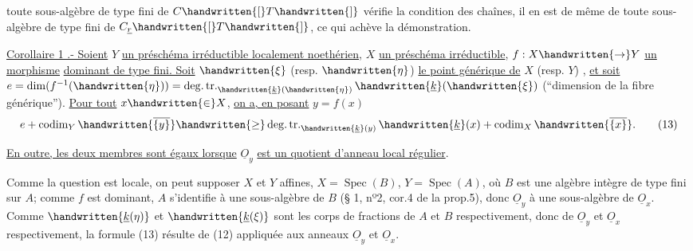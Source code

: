toute sous-algèbre de type fini de $C\handwritten{[}T\handwritten{]}$ vérifie la condition des chaînes, il en est de même de toute sous-algèbre de type fini de $C_{\underline{r}}\handwritten{[}T\handwritten{]}$, ce qui achève la démonstration.

\uline{Corollaire 1 .- Soient} $Y$ \uline{un préschéma irréductible localement noethérien}, $X$ \uline{un préschéma irréductible}, $f:X\handwritten{\to}Y$ \uline{un morphisme}  \uline{dominant de type fini. Soit} $\handwritten{\xi}$ (resp. $\handwritten{\eta}$) \uline{le point générique de} $X$ (resp. $Y$) , \uline{et soit} $e=\dim(f^{-1}(\handwritten{\eta}))=\operatorname{deg.tr.}_{\handwritten{\underline{k}}(\handwritten{\eta})}\handwritten{\underline{k}}(\handwritten{\xi})$ (``dimension de la fibre générique\unsure{/}''). \uline{Pour tout} $x\handwritten{\in}X$, \uline{on a, en posant} $y=f(x)$
\[
 e+\operatorname{codim}_Y\handwritten{\overline{\{y\}}}\handwritten{\geq}
 \operatorname{deg.tr.}_{\handwritten{\underline{k}}(y)}\handwritten{\underline{k}}(x)
 +\operatorname{codim}_X\handwritten{\overline{\{x\}}}.\tag*{(13)}
\]

\uline{En outre, les deux membres sont égaux lorsque} $\underline O_y$ \uline{est un quotient d'anneau local régulier}.

Comme la question est locale, on peut supposer $X$ et $Y$ affines,   $X=\operatorname{Spec}(B)$, $Y=\operatorname{Spec}(A)$, où $B$ est une algèbre intègre de type fini sur $A$; comme $f$ est dominant, $A$ s'identifie à une sous-algèbre de $B$ (§ 1, nº2, cor.4 de la prop.5), donc $\underline O_y$ à une sous-algèbre de $\underline O_x$. Comme $\handwritten{\underline k(\eta)}$ et $\handwritten{\underline k(\xi)}$ sont les corps de fractions de $A$ et $B$ respectivement, donc de  $\underline O_y$ et $\underline O_x$ respectivement, la formule (13) résulte de (12) appliquée aux anneaux $\underline O_y$ et $\underline O_x$.

